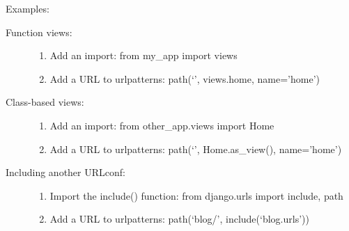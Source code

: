 \documentclass[letterpaper,10pt,openany,oneside,english]{sphinxmanual}
\begin{document}
Examples:
\begin{description}
\item[{Function views:}] \leavevmode\begin{enumerate}
\item {} 
Add an import:  from my\_app import views

\item {} 
Add a URL to urlpatterns:  path(‘’, views.home, name=’home’)

\end{enumerate}

\item[{Class-based views:}] \leavevmode\begin{enumerate}
\item {} 
Add an import:  from other\_app.views import Home

\item {} 
Add a URL to urlpatterns:  path(‘’, Home.as\_view(), name=’home’)

\end{enumerate}

\item[{Including another URLconf:}] \leavevmode\begin{enumerate}
\item {} 
Import the include() function: from django.urls import include, path

\item {} 
Add a URL to urlpatterns:  path(‘blog/’, include(‘blog.urls’))

\end{enumerate}

\end{description}



\renewcommand{\indexname}{Index}
\printindex
\end{document}

